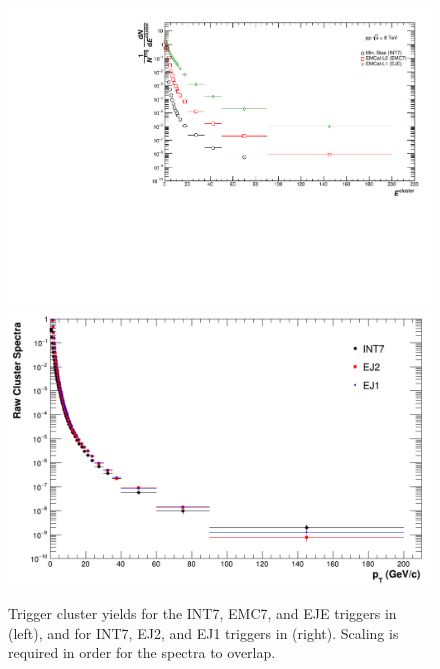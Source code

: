 \begin{figure}
    \centering
    \includegraphics[width=15cm]{figures/TriggerClusters/clusters_R02.pdf}
    \includegraphics[width=15cm]{figures/pPbFigures/TriggerClusters/rawclusterspectra_alltriggers_R02.png}
    \caption{Trigger cluster yields for the INT7, EMC7, and EJE triggers in \pp (left), and for INT7, EJ2, and EJ1 triggers in \pPb (right). Scaling is required in order for the spectra to overlap.}
    \label{fig:triggerClusters}
\end{figure}


